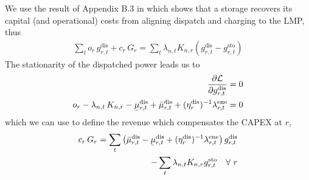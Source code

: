 \documentclass[11pt,twocolumn]{article}
\newcommand{\ubar}[1]{\underaccent{\bar}{#1}}
\newcommand{\Forall}[1]{\hspace{10pt} \forall \,\, #1 }
\newcommand{\pdv}[2]{\frac{\partial #1}{\partial #2}}
\newcommand{\storage}{g_{r,t}}
\newcommand{\storagedispatch}{\storage^\text{dis}}
\newcommand{\storagecharge}{\storage^\text{sto}}
\newcommand{\storagesoc}{\storage^\text{ene}}
\newcommand{\efficiency}{\eta_{r}}
\newcommand{\efficiencydispatch}{\efficiency^\text{dis}}
\newcommand{\efficiencycharge}{\efficiency^\text{sto}}
\newcommand{\efficiencysoc}{\efficiency^\text{ene}}
\newcommand{\operationalpricestorage}{o_r}
\newcommand{\capitalpricestorage}{c_r}
\newcommand{\capacitystorage}{G_r}
\newcommand{\mulowerstoragedispatch}{\ubar{\mu}_{r,t}^\text{dis}}
\newcommand{\muupperstoragedispatch}{\bar{\mu}_{r,t}^\text{dis}}
\newcommand{\mulowerstoragecharge}{\ubar{\mu}_{r,t}^\text{sto}}
\newcommand{\muupperstoragecharge}{\bar{\mu}_{r,t}^\text{sto}}
\newcommand{\mulowerstoragesoc}{\ubar{\mu}_{r,t}^\text{ene}}
\newcommand{\muupperstoragesoc}{\bar{\mu}_{r,t}^\text{ene}}
\newcommand{\mustateofcharge}{\lambda^\text{ene}_{r,t}}
\newcommand{\munextstateofcharge}{\lambda^\text{ene}_{r,t+1}}
\newcommand{\lagrangian}{\mathcal{L}}
\newcommand{\lmp}[1][n]{\lambda_{#1,t}}
\newcommand{\incidencestorage}[1][n]{K_{#1,r}}
\begin{document}
We use the result of Appendix B.3 in \cite{brown_decreasing_2020} which shows that a storage recovers its capital (and operational) costs from aligning dispatch and charging to the LMP, thus 
\begin{align}
    \sum_t \operationalpricestorage \, \storagedispatch + \capitalpricestorage \, \capacitystorage = \sum_t \lmp \incidencestorage \left(\storagedispatch - \storagecharge \right) 
\end{align}
The stationarity of the dispatched power leads us to  
\begin{align}
    \notag
    \pdv{\lagrangian}{\storagedispatch} &= 0 \\
    \operationalpricestorage -  \lmp \, \incidencestorage - \mulowerstoragedispatch + \muupperstoragedispatch + (\efficiencydispatch )^{-1} \mustateofcharge &= 0  
    \label{eq:stationarity_storagedispatch}
\end{align}
which we can use to define the revenue which compensates the CAPEX at $r$, 
\begin{align}
    \notag
    \capitalpricestorage \, \capacitystorage = \sum_t \left(\muupperstoragedispatch - \mulowerstoragedispatch  + (\efficiencydispatch )^{-1} \mustateofcharge \right) \storagedispatch \\
    - \sum_t \lmp \incidencestorage  \storagecharge \Forall{r} 
\end{align}

\end{document}
